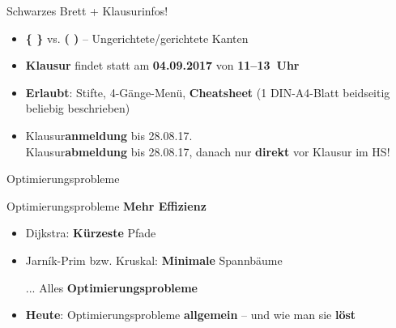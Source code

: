 



\newcommand{\Knapsack}{\textsc{Knapsack}\xspace}


	
	
\begin{frame}{Schwarzes Brett + Klausurinfos!}
	\begin{itemize}
		\item {\Large \textbf{\{ \}} vs. \textbf{( )}} – Ungerichtete/gerichtete Kanten
		\item \textbf{Klausur} findet statt am \textbf{04.09.2017} von \textbf{11–13~Uhr} \\
		\item \textbf{Erlaubt}: Stifte, 4-Gänge-Menü, \textbf{Cheatsheet} (1 DIN-A4-Blatt beidseitig beliebig beschrieben) 
		\item Klausur\textbf{anmeldung} bis 28.08.17. \\
		Klausur\textbf{abmeldung} bis 28.08.17, danach nur \textbf{direkt} vor Klausur im HS!
	\end{itemize}
\end{frame}
	
\begin{headframe}
	Optimierungsprobleme
\end{headframe}
	
\begin{frame}{Optimierungsprobleme}
	\textbf{Mehr Effizienz} 
	\begin{itemize}
		\item Dijkstra: \textbf{Kürzeste} Pfade
		\item Jarník-Prim bzw. Kruskal: \textbf{Minimale} Spannbäume
		\item[...]
		\implitem Alles \textbf{Optimierungsprobleme}
		\pause
		\item \textbf{Heute}: Optimierungsprobleme \textbf{allgemein} – und wie man sie \textbf{löst} \\
	\end{itemize}
\end{frame}

